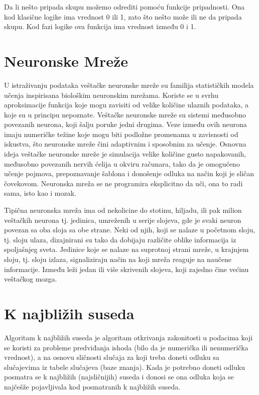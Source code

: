 \documentclass[a4paper]{article}
\begin{document}
Da li nešto pripada skupu možemo odrediti pomoću funkcije pripadnosti. Ona kod klasične logike ima vrednost 0 ili 1, zato što nešto može 
ili ne da pripada skupu. Kod fazi logike ova funkcija ima vrednost između 0 i 1. \cite{fl}


\section{Neuronske Mreže}
\label{sec:neuronskemreze}

U istraživanju podataka veštačke neuronske mreže su familija statističkih modela učenja inspirisana biološkim neuronskim mrežama. 
Koriste se u svrhu aproksimacije funkcija koje mogu zavisiti od velike količine ulaznih podataka, a koje su u principu nepoznate. Veštačke 
neuronske mreže su sistemi međusobno povezanih neurona, koji šalju poruke jedni drugima. Veze između ovih neurona imaju numeričke 
težine koje mogu biti podložne promenama u zavisnosti od iskustva, što neuronske mreže čini adaptivnim i sposobnim za učenje. Osnovna 
ideja veštačke neuronske mreže je simulacija velike količine gusto napakovanih, međusobno povezanih nervih ćelija u okviru 
računara, tako da je omogućeno učenje pojmova, prepoznavanje šablona i donošenje odluka na način koji je sličan čovekovom.
Neuronska mreža se ne programira eksplicitno da uči, ona to radi sama, isto kao i mozak.\cite{master_rad}

Tipična neuronska mreža ima od nekolicine do stotinu, hiljadu, ili pak milion veštačkih neurona tj. jedinica, umreženih u serije slojeva, gde 
je svaki neuron povezan sa oba sloja sa obe strane. Neki od njih, koji se nalaze u početnom sloju, tj. sloju ulaza, dizajnirani su tako da
dobijaju različite oblike informacija iz spoljašnjeg sveta. Jedinice koje se nalaze na suprotnoj strani mreže, u krajnjem sloju, tj. sloju izlaza, 
signaliziraju način na koji mreža reaguje na naučene informacije. Između leži jedan ili više skrivenih slojeva, koji zajedno čine većinu
veštačkog mozga.\cite{master_rad}

\section{K najbližih suseda}
\label{sec:knn}

Algoritam k najbližih suseda je algoritam otkrivanja zakonitosti u podacima koji se koristi za probleme predviđanja ishoda (bilo da je 
numerička ili nenumerička vrednost), a na osnovu sličnosti slučaja za koji treba doneti odluku sa slučajevima iz tabele slučajeva (baze
znanja). Kada je potrebno doneti odluku posmatra se k najbližih (najsličnijih) suseda i donosi se
ona odluka koja se najčešže pojavljivala kod posmatranih k najbližih suseda.
\end{document}

